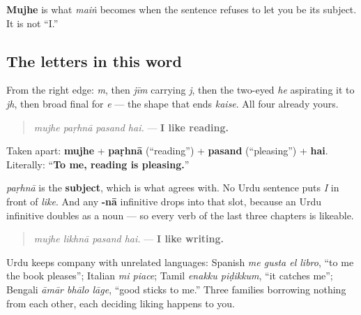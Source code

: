 \textbf{Mujhe} is what \textbf{} \emph{maiṅ} becomes when the sentence refuses to let you be its subject. It is not “I.”

\subsection*{The letters in this word}
From the right edge: \textbf{} \emph{m}, then \emph{jīm} carrying \emph{j}, then the two-eyed \emph{he} aspirating it to \emph{jh}, then broad final \textbf{} for \emph{e} — the shape that ends \textbf{} \emph{kaise}. All four already yours.

\begin{grammarlens}[title={Grammar Lens: the thing you like is the subject}]
\begin{quote}
\emph{mujhe paṛhnā pasand hai.} — \textbf{I like reading.}
\end{quote}

Taken apart: \textbf{mujhe} + \textbf{paṛhnā} (“reading”) + \textbf{pasand} (“pleasing”) + \textbf{hai}. Literally: “\textbf{To me, reading is pleasing.}”

\emph{paṛhnā} is the \textbf{subject}, which is what \textbf{} agrees with. No Urdu sentence puts \emph{I} in front of \emph{like}. And any \textbf{-nā} infinitive drops into that slot, because an Urdu infinitive doubles as a noun — so every verb of the last three chapters is likeable.

\begin{quote}
\emph{mujhe likhnā pasand hai.} — \textbf{I like writing.}
\end{quote}

Urdu keeps company with unrelated languages: Spanish \emph{me gusta el libro}, “to me the book pleases”; Italian \emph{mi piace}; Tamil \emph{enakku piḍikkum}, “it catches me”; Bengali \emph{āmār bhālo lāge}, “good sticks to me.” Three families borrowing nothing from each other, each deciding liking happens to you.
\end{grammarlens}

